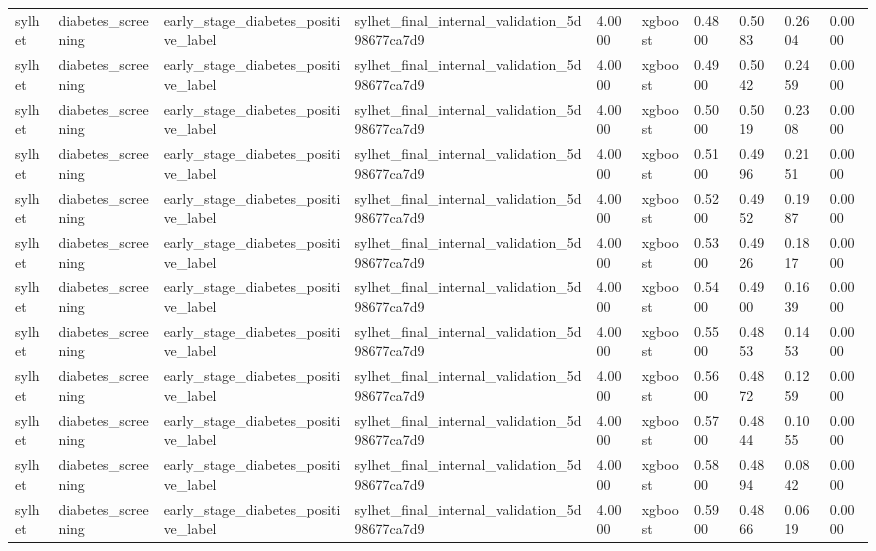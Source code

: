\begin{tabular}{llllllllll}
sylhet & diabetes\_screening & early\_stage\_diabetes\_positive\_label & sylhet\_final\_internal\_validation\_5d98677ca7d9 & 4.0000 & xgboost & 0.4800 & 0.5083 & 0.2604 & 0.0000 \\
sylhet & diabetes\_screening & early\_stage\_diabetes\_positive\_label & sylhet\_final\_internal\_validation\_5d98677ca7d9 & 4.0000 & xgboost & 0.4900 & 0.5042 & 0.2459 & 0.0000 \\
sylhet & diabetes\_screening & early\_stage\_diabetes\_positive\_label & sylhet\_final\_internal\_validation\_5d98677ca7d9 & 4.0000 & xgboost & 0.5000 & 0.5019 & 0.2308 & 0.0000 \\
sylhet & diabetes\_screening & early\_stage\_diabetes\_positive\_label & sylhet\_final\_internal\_validation\_5d98677ca7d9 & 4.0000 & xgboost & 0.5100 & 0.4996 & 0.2151 & 0.0000 \\
sylhet & diabetes\_screening & early\_stage\_diabetes\_positive\_label & sylhet\_final\_internal\_validation\_5d98677ca7d9 & 4.0000 & xgboost & 0.5200 & 0.4952 & 0.1987 & 0.0000 \\
sylhet & diabetes\_screening & early\_stage\_diabetes\_positive\_label & sylhet\_final\_internal\_validation\_5d98677ca7d9 & 4.0000 & xgboost & 0.5300 & 0.4926 & 0.1817 & 0.0000 \\
sylhet & diabetes\_screening & early\_stage\_diabetes\_positive\_label & sylhet\_final\_internal\_validation\_5d98677ca7d9 & 4.0000 & xgboost & 0.5400 & 0.4900 & 0.1639 & 0.0000 \\
sylhet & diabetes\_screening & early\_stage\_diabetes\_positive\_label & sylhet\_final\_internal\_validation\_5d98677ca7d9 & 4.0000 & xgboost & 0.5500 & 0.4853 & 0.1453 & 0.0000 \\
sylhet & diabetes\_screening & early\_stage\_diabetes\_positive\_label & sylhet\_final\_internal\_validation\_5d98677ca7d9 & 4.0000 & xgboost & 0.5600 & 0.4872 & 0.1259 & 0.0000 \\
sylhet & diabetes\_screening & early\_stage\_diabetes\_positive\_label & sylhet\_final\_internal\_validation\_5d98677ca7d9 & 4.0000 & xgboost & 0.5700 & 0.4844 & 0.1055 & 0.0000 \\
sylhet & diabetes\_screening & early\_stage\_diabetes\_positive\_label & sylhet\_final\_internal\_validation\_5d98677ca7d9 & 4.0000 & xgboost & 0.5800 & 0.4894 & 0.0842 & 0.0000 \\
sylhet & diabetes\_screening & early\_stage\_diabetes\_positive\_label & sylhet\_final\_internal\_validation\_5d98677ca7d9 & 4.0000 & xgboost & 0.5900 & 0.4866 & 0.0619 & 0.0000 \\

\end{tabular}
